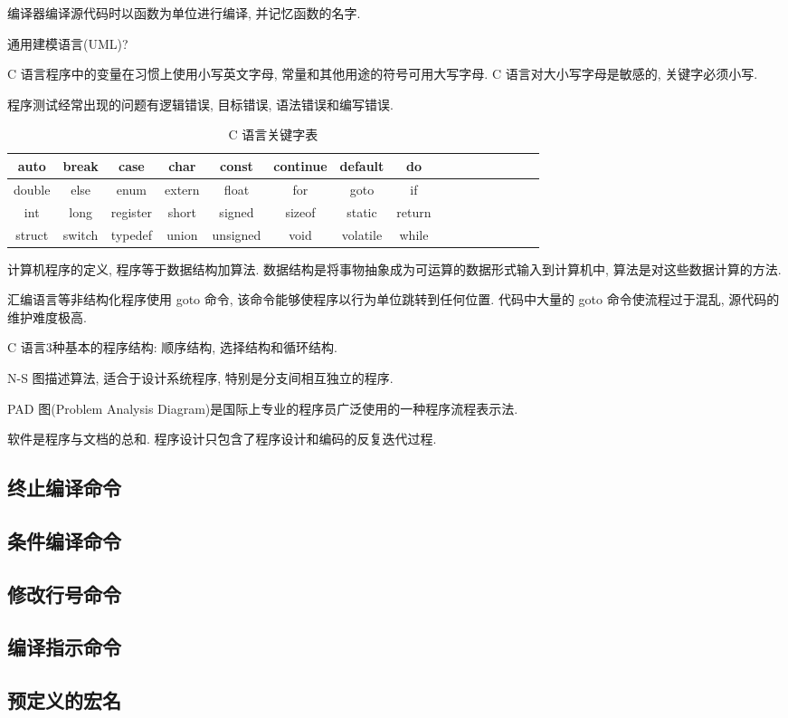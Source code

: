 编译器编译源代码时以函数为单位进行编译, 并记忆函数的名字.

通用建模语言(UML)?

C 语言程序中的变量在习惯上使用小写英文字母, 常量和其他用途的符号可用大写字母.
C 语言对大小写字母是敏感的, 关键字必须小写.

程序测试经常出现的问题有逻辑错误, 目标错误, 语法错误和编写错误.

\begin{table}[H]
\small %
\sffamily %
\centering %
\renewcommand{\arraystretch}{1.4} %
\caption{C 语言关键字表}
\begin{tabular}{*{2}{c|c|c|c|c|c|c|c}}
 \hline
 auto & break & case & char & const & continue & default & do\\ \hline
 double & else & enum & extern & float & for & goto & if\\ \hline
 int & long & register & short & signed & sizeof & static & return\\ \hline
 struct & switch & typedef & union & unsigned & void & volatile & while\\ \hline
\end{tabular}
\end{table}

计算机程序的定义, 程序等于数据结构加算法. 数据结构是将事物抽象成为可运算的数据形式输入到计算机中,
算法是对这些数据计算的方法.

汇编语言等非结构化程序使用 goto 命令, 该命令能够使程序以行为单位跳转到任何位置. 代码中大量的 goto
命令使流程过于混乱, 源代码的维护难度极高.

C 语言3种基本的程序结构: 顺序结构, 选择结构和循环结构.

N-S 图描述算法, 适合于设计系统程序, 特别是分支间相互独立的程序.

PAD 图(Problem Analysis Diagram)是国际上专业的程序员广泛使用的一种程序流程表示法.

软件是程序与文档的总和. 程序设计只包含了程序设计和编码的反复迭代过程.

\subsection{终止编译命令}

\subsection{条件编译命令}

\subsection{修改行号命令}

\subsection{编译指示命令}

\subsection{预定义的宏名}
